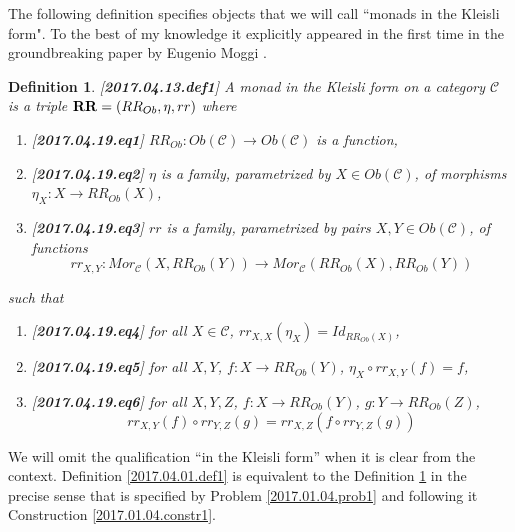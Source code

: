 \documentclass[12pt]{amsart}
\newtheorem{definition}[proposition]{Definition}
\newcommand{\llabel}[1]{\label{#1}[{\bf #1}]}
\newcommand{\sr}{\rightarrow}
\newcommand{\RR}{{\bf RR}}
\newcommand{\C}{{\mathcal C}}
\begin{document}
The following definition specifies objects that we will call ``monads in the Kleisli form". To the best of my knowledge it explicitly appeared in the first time in the groundbreaking paper by Eugenio Moggi \cite{Moggi}. 
%
\begin{definition}
\llabel{2017.04.13.def1}
A monad in the Kleisli form on a category $\C$ is a triple $\RR=(RR_{Ob},\eta,rr)$ where 
%
\begin{enumerate}
\item \llabel{2017.04.19.eq1} $RR_{Ob}:Ob(\C)\sr Ob(\C)$ is a function,
\item \llabel{2017.04.19.eq2} $\eta$ is a family, parametrized by $X\in Ob(\C)$, of morphisms $\eta_X:X\sr RR_{Ob}(X)$,
\item \llabel{2017.04.19.eq3} $rr$ is a family, parametrized by pairs $X,Y\in Ob(\C)$, of functions 
%
$$rr_{X,Y}:Mor_{\C}(X,RR_{Ob}(Y))\sr Mor_{\C}(RR_{Ob}(X),RR_{Ob}(Y))$$
%
\end{enumerate}
%
such that
%
\begin{enumerate}[resume]
\item \llabel{2017.04.19.eq4} for all $X\in\C$, $rr_{X,X}(\eta_X)=Id_{RR_{Ob}(X)}$,
\item \llabel{2017.04.19.eq5} for all $X,Y$, $f:X\sr RR_{Ob}(Y)$, $\eta_X\circ rr_{X,Y}(f)=f$,
\item \llabel{2017.04.19.eq6} for all $X,Y,Z$, $f:X\sr RR_{Ob}(Y)$, $g:Y\sr RR_{Ob}(Z)$, 
%
$$rr_{X,Y}(f)\circ rr_{Y,Z}(g)=rr_{X,Z}(f\circ rr_{Y,Z}(g))$$
%
\end{enumerate}
\end{definition}
%
We will omit the qualification ``in the Kleisli form'' when it is clear from the context. 
Definition \ref{2017.04.01.def1} is equivalent to the Definition \ref{2017.04.13.def1} in the precise sense that is specified by Problem \ref{2017.01.04.prob1} and following  it Construction \ref{2017.01.04.constr1}. 
%
\end{document}
